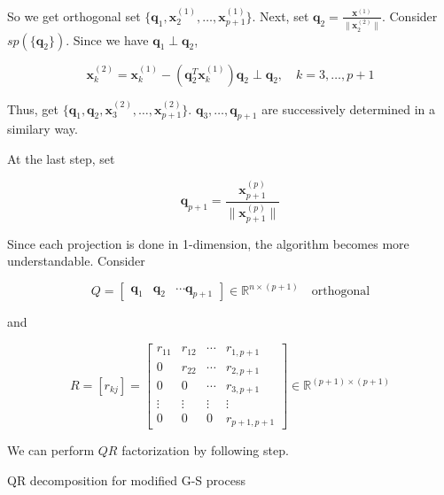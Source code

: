 \documentclass[]{book}
\theoremstyle{definition}
\theoremstyle{definition}
\theoremstyle{definition}
\theoremstyle{remark}
\begin{document}
So we get orthogonal set \(\{ \mathbf{q}_1, \mathbf{x}_2^{(1)}, \ldots, \mathbf{x}_{p + 1}^{(1)} \}\). Next, set \(\mathbf{q}_2 = \frac{\mathbf{x}^{(1)}}{\lVert \mathbf{x}_2^{(2)} \rVert}\). Consider \(sp(\{ \mathbf{q}_2 \})\). Since we have \(\mathbf{q}_1 \perp \mathbf{q}_2\),

\[\mathbf{x}_k^{(2)} = \mathbf{x}_k^{(1)} - (\mathbf{q}_2^T \mathbf{x}_k^{(1)})\mathbf{q}_2 \perp \mathbf{q}_2 , \quad k = 3, \ldots, p + 1\]

Thus, get \(\{ \mathbf{q}_1, \mathbf{q}_2, \mathbf{x}_3^{(2)}, \ldots, \mathbf{x}_{p + 1}^{(2)} \}\). \(\mathbf{q}_3, \ldots, \mathbf{q}_{p + 1}\) are successively determined in a similary way.

At the last step, set

\[\mathbf{q}_{p + 1} = \frac{\mathbf{x}_{p + 1}^{(p)}}{\lVert \mathbf{x}_{p + 1}^{(p)} \rVert}\]

Since each projection is done in 1-dimension, the algorithm becomes more understandable. Consider

\[
Q = \begin{bmatrix}
  \mathbf{q}_1 & \mathbf{q}_2 & \cdots \mathbf{q}_{p + 1}
\end{bmatrix} \in \mathbb{R}^{n \times (p + 1)} \quad \text{orthogonal}
\]

and

\[
R = [r_{kj}] = \begin{bmatrix}
  r_{11} & r_{12} & \cdots & r_{1,p+1} \\
  0 & r_{22} & \cdots & r_{2, p+1} \\
  0 & 0 & \cdots & r_{3,p+1} \\
  \vdots & \vdots & \vdots & \vdots \\
  0 & 0 & 0 & r_{p+1, p+1}
\end{bmatrix} \in \mathbb{R}^{(p+1) \times (p + 1)}
\]

We can perform \(QR\) factorization by following step.

\begin{algorithm} \label{alg:algqr}
  \SetAlgoLined
  \caption{QR decomposition for modified G-S process}
\end{algorithm}
\end{document}
